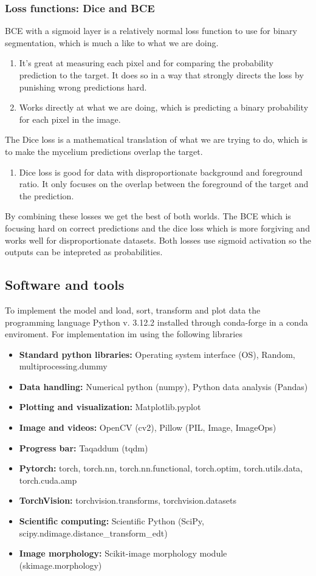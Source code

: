 \documentclass[a4paper,12pt]{article}
\begin{document}
\subsubsection{Loss functions: Dice and BCE}
BCE with a sigmoid layer is a relatively normal loss function to use for binary segmentation, which is much a like to what we are doing.
\begin{enumerate}
  \item It's great at measuring each pixel and for comparing the probability prediction to the target. It does so in a way that strongly directs the loss by punishing wrong predictions hard.
  \item Works directly at what we are doing, which is predicting a binary probability for each pixel in the image.
\end{enumerate}
The Dice loss is a mathematical translation of what we are trying to do, which is to make the mycelium predictions overlap the target.
\begin{enumerate}
  \item Dice loss is good for data with disproportionate background and foreground ratio. It only focuses on the overlap between the foreground of the target and the prediction.
\end{enumerate}
By combining these losses we get the best of both worlds. The BCE which is focusing hard on correct predictions and the dice loss which is more forgiving and works well for disproportionate datasets. Both losses use sigmoid activation so the outputs can be intepreted as probabilities.
\subsection{Software and tools}
To implement the model and load, sort, transform and plot data the programming language Python v. 3.12.2 installed through conda-forge in a conda enviroment.
For implementation im using the following libraries
\begin{itemize}
  \item \textbf{Standard python libraries:} Operating system interface (OS), Random, multiprocessing.dummy
  \item \textbf{Data handling:} Numerical python (numpy), Python data analysis (Pandas)
  \item \textbf{Plotting and visualization:} Matplotlib.pyplot
  \item \textbf{Image and videos:} OpenCV (cv2), Pillow (PIL, Image, ImageOps)
  \item \textbf{Progress bar:} Taqaddum (tqdm)
  \item \textbf{Pytorch:} torch, torch.nn, torch.nn.functional, torch.optim, torch.utils.data, torch.cuda.amp
  \item \textbf{TorchVision:} torchvision.transforms, torchvision.datasets
  \item \textbf{Scientific computing:} Scientific Python (SciPy, scipy.ndimage.distance\_transform\_edt)
  \item \textbf{Image morphology:} Scikit-image morphology module (skimage.morphology)
\end{itemize}
\end{document}
